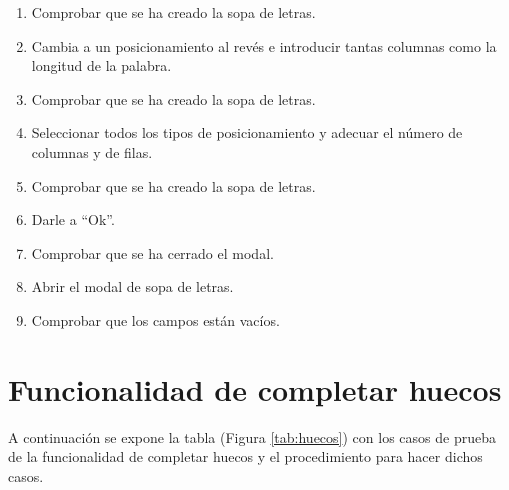 \begin{enumerate}
    \item Comprobar que se ha creado la sopa de letras.
    \item Cambia a un posicionamiento al revés e introducir tantas columnas como la longitud de la palabra.
    \item Comprobar que se ha creado la sopa de letras.
    \item Seleccionar todos los tipos de posicionamiento y adecuar el número de columnas y de filas.
    \item Comprobar que se ha creado la sopa de letras.
    \item Darle a ``Ok''.
    \item Comprobar que se ha cerrado el modal.
    \item Abrir el modal de sopa de letras.
    \item Comprobar que los campos están vacíos.
\end{enumerate}

\section{Funcionalidad de completar huecos}
\label{planPruebas:huecos}
A continuación se expone la tabla (Figura \ref{tab:huecos}) con los casos de prueba de la funcionalidad de completar huecos y el procedimiento para hacer dichos casos.

